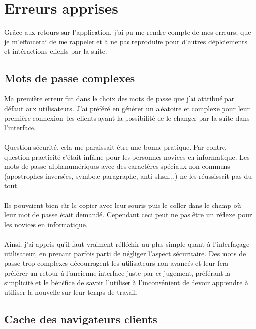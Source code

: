 \section{Erreurs apprises}

Grâce aux retours sur l'application, j'ai pu me rendre compte de mes erreurs; que je m'efforcerai de me rappeler et à ne pas reproduire pour d'autres déploiements et intéractions clients par la suite.

\subsection{Mots de passe complexes}

Ma première erreur fut dans le choix des mots de passe que j'ai attribué par défaut aux utilisateurs. J'ai préféré en générer un aléatoire et complexe pour leur première connexion, les clients ayant la possibilité de le changer par la suite dans l'interface.
\\ \\
Question sécurité, cela me paraissait être une bonne pratique. Par contre, question practicité c'était infâme pour les personnes novices en informatique. Les mots de passe alphanumériques avec des caractères spéciaux non communs (apostrophes inversées, symbole paragraphe, anti-slash...) ne les réussissait pas du tout.
\\ \\
Ils pouvaient bien-sûr le copier avec leur souris puis le coller dans le champ où leur mot de passe était demandé. Cependant ceci peut ne pas être un réflexe pour les novices en informatique.
\\ \\
Ainsi, j'ai appris qu'il faut vraiment réfléchir au plus simple quant à l'interfaçage utilisateur, en prenant parfois parti de négliger l'aspect sécuritaire. Des mots de passe trop complexes décourragent les utilisateurs non avancés et leur fera préférer un retour à l'ancienne interface juste par ce jugement, préférant la simplicité et le bénéfice de savoir l'utiliser à l'inconvénient de devoir apprendre à utiliser la nouvelle sur leur temps de travail.

\subsection{Cache des navigateurs clients}


